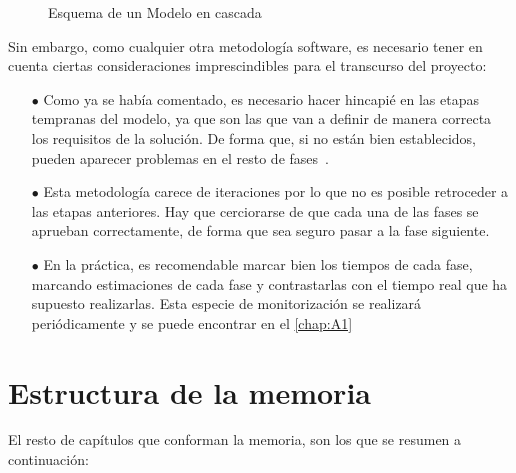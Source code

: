 \begin{figure}[h!]
\caption{Esquema de un Modelo en cascada} \label{fig:M1}
\end{figure}

Sin embargo, como cualquier otra metodología software, es necesario tener en cuenta ciertas consideraciones imprescindibles para el transcurso del proyecto:

\begin{itemize}
   \item[$\bullet$] Como ya se había comentado, es necesario hacer hincapié en las etapas tempranas del modelo, ya que son
   las que van a definir de manera correcta los requisitos de la solución. De forma que, si no están bien establecidos, pueden 
   aparecer problemas en el resto de fases~\cite{wiegers2013software}.
   \item[$\bullet$] Esta metodología carece de iteraciones por lo que no es posible retroceder a las etapas anteriores.
   Hay que cerciorarse de que cada una de las fases se aprueban correctamente, de forma que sea seguro pasar a la
   fase siguiente.
   \item[$\bullet$] En la práctica, es recomendable marcar bien los tiempos de cada fase, marcando estimaciones de cada fase y contrastarlas con
   el tiempo real que ha supuesto realizarlas. Esta especie de monitorización se realizará periódicamente y se puede encontrar 
   en el \autoref{chap:A1}
\end{itemize}

\section{Estructura de la memoria} %

El resto de capítulos que conforman la memoria, son los que se resumen a continuación:

